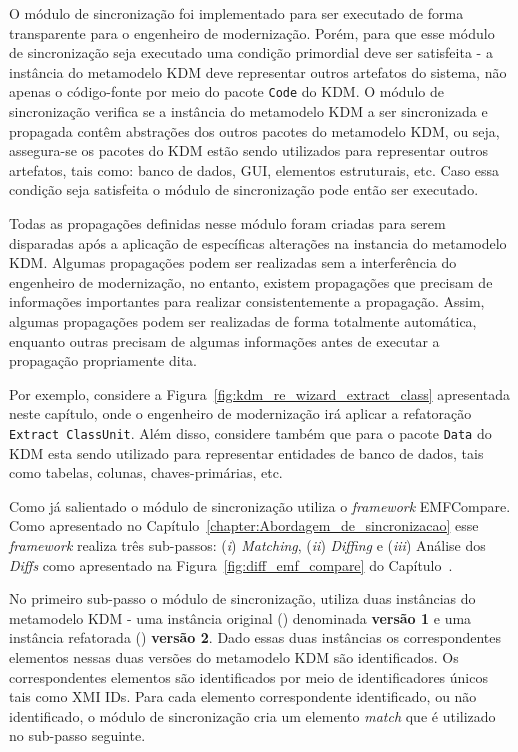 O módulo de sincronização foi implementado para ser executado de forma transparente para o engenheiro de modernização. Porém, para que esse módulo de sincronização seja executado uma condição primordial deve ser satisfeita - a instância do metamodelo KDM deve representar outros artefatos do sistema, não apenas o código-fonte por meio do pacote \texttt{Code} do KDM. O módulo de sincronização verifica se a instância do metamodelo KDM a ser sincronizada e propagada contêm abstrações dos outros pacotes do metamodelo KDM, ou seja, assegura-se os pacotes do KDM estão sendo utilizados para representar outros artefatos, tais como: banco de dados, GUI, elementos estruturais, etc. Caso essa condição seja satisfeita o módulo de sincronização pode então ser executado.

Todas as propagações definidas nesse módulo foram criadas para serem disparadas após a aplicação de específicas alterações na instancia do metamodelo KDM. Algumas propagações podem ser realizadas sem a interferência do engenheiro de modernização, no entanto, existem propagações que precisam de informações importantes para realizar consistentemente a propagação. Assim, algumas propagações podem ser realizadas de forma totalmente automática, enquanto outras precisam de algumas informações antes de executar a propagação propriamente dita.

Por exemplo, considere a Figura~\ref{fig:kdm_re_wizard_extract_class} apresentada neste capítulo, onde o engenheiro de modernização irá aplicar a refatoração \texttt{Extract ClassUnit}. Além disso, considere também que para o pacote \texttt{Data} do KDM esta sendo utilizado para representar entidades de banco de dados, tais como tabelas, colunas, chaves-primárias, etc.

Como já salientado o módulo de sincronização utiliza o \textit{framework} EMFCompare. Como apresentado no Capítulo~\ref{chapter:Abordagem_de_sincronizacao} esse \textit{framework} realiza três sub-passos: (\textit{i}) \textit{Matching}, (\textit{ii}) \textit{Diffing} e (\textit{iii}) Análise dos \textit{Diffs} como apresentado na Figura~\ref{fig:diff_emf_compare} do Capítulo~\cite{chapter:Abordagem_de_sincronizacao}.

No primeiro sub-passo o módulo de sincronização, utiliza duas instâncias do metamodelo KDM - uma instância original () denominada \textbf{versão 1} e uma instância refatorada () \textbf{versão 2}. Dado essas duas instâncias os correspondentes elementos nessas duas versões do metamodelo KDM são identificados. Os correspondentes elementos são identificados por meio de identificadores únicos tais como XMI IDs. Para cada elemento correspondente identificado, ou não identificado, o módulo de sincronização cria um elemento \textit{match} que é utilizado no sub-passo seguinte.

